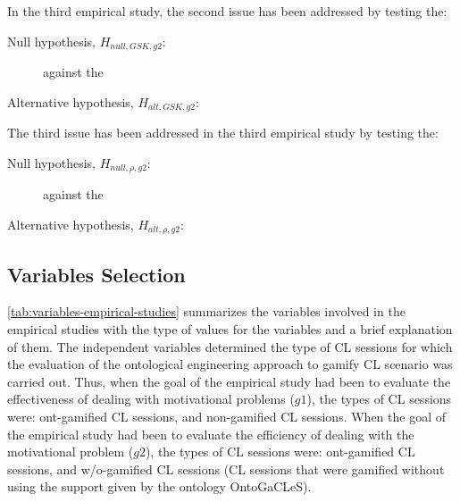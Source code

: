 In the third empirical study, the second issue  has been addressed by testing the:

\begin{description}
\item[Null hypothesis, $H_{null,GSK,g2}$:]
 against the
\item[Alternative hypothesis, $H_{alt,GSK,g2}$:]
\end{description}

The third issue  has been addressed in the third empirical study by testing the:

\begin{description}
\item[Null hypothesis, $H_{null,\rho,g2}$:]
 against the
\item[Alternative hypothesis, $H_{alt,\rho,g2}$:]
\end{description}


\subsection{Variables Selection}

\autoref{tab:variables-empirical-studies} summarizes the variables involved in the empirical studies with the type of values for the variables and a brief explanation of them.
The independent variables  determined the type of CL sessions for which the evaluation of the ontological engineering approach to gamify CL scenario was carried out.
Thus, when the goal of the empirical study had been to evaluate the effectiveness of dealing with motivational problems ($g1$), the types of CL sessions were: 
ont-gamified CL sessions, and non-gamified CL sessions.
When the goal of the empirical study had been to evaluate the efficiency of dealing with the motivational problem ($g2$), the types of CL sessions were: ont-gamified CL sessions, and w/o-gamified CL sessions (CL sessions that were gamified without using the support given by the ontology OntoGaCLeS).

